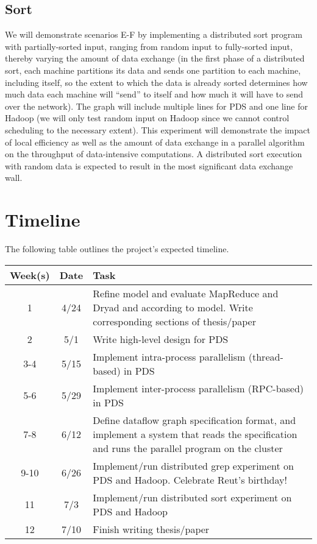 \documentclass{acm_proc_article-sp}
\begin{document}
\subsection{Sort}
 We will demonstrate scenarios E-F by implementing a distributed sort program with partially-sorted input, ranging from random input to fully-sorted input, thereby varying the amount of data exchange (in the first phase of a distributed sort, each machine partitions its data and sends one partition to each machine, including itself, so the extent to which the data is already sorted determines how much data each machine will ``send'' to itself and how much it will have to send over the network). The graph will include multiple lines for PDS and one line for Hadoop (we will only test random input on Hadoop since we cannot control scheduling to the necessary extent). This experiment will demonstrate the impact of local efficiency as well as the amount of data exchange in a parallel algorithm on the throughput of data-intensive computations. A distributed sort execution with random data is expected to result in the most significant data exchange wall.

\section{Timeline}
The following table outlines the project's expected timeline.
\newenvironment{noop}{}{}
\begin{noop}\begin{tabular}{|c|c|p{2.2in}|} \hline
Week(s)&Date&Task\\ \hline
1 & 4/24 & Refine model and evaluate MapReduce and Dryad and according to model. Write corresponding sections of thesis/paper\\ \hline
2 & 5/1 & Write high-level design for PDS\\ \hline
3-4 & 5/15 & Implement intra-process parallelism (thread-based) in PDS\\ \hline
5-6 & 5/29 & Implement inter-process parallelism (RPC-based) in PDS\\ \hline
7-8 & 6/12 & Define dataflow graph specification format, and implement a system that reads the specification and runs the parallel program on the cluster\\ \hline
9-10 & 6/26 & Implement/run distributed grep experiment on PDS and Hadoop. Celebrate Reut's birthday!\\ \hline
11 & 7/3 & Implement/run distributed sort experiment on PDS and Hadoop\\ \hline
12 & 7/10 & Finish writing thesis/paper\\
\hline\end{tabular}\end{noop}
\end{document}
